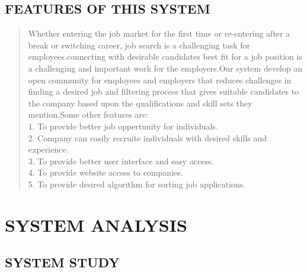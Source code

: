 \documentclass[12pt,a4paper,final]{extreport}
\begin{document}
\section{FEATURES OF THIS SYSTEM}

\begin{quote}
{ 
	\hspace{01.5cm}Whether entering the job market for the first time or re-entering after a break or switching career, job search is a challenging task for employees.connecting with desirable candidates best fit for a job position is a challenging and important work for the employers.Our system develop an open community for employees and employers that reduces challenges in finding a desired  job   and filtering process that gives suitable candidates to the company based upon the qualifications and skill sets they mention.Some other features are:\\ 

\vspace{0.1cm}
1.	To provide better job oppertunity for individuals.\\ 
2.	Company can easily recruite individuals with desired skills and experience.\\ 
3.	To provide better user interface and easy access.\\ 
4.  To provide website access to companies.\\
5.	To provide desired algorithm for sorting job applications.\\
}
\end{quote}
\chapter{SYSTEM ANALYSIS}
\section{SYSTEM STUDY}
\end{document}
